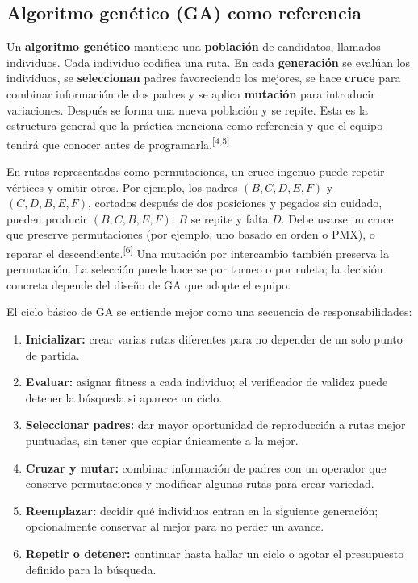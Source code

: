 \documentclass[11pt,letterpaper]{article}
\newcommand{\src}[1]{\textsuperscript{\textcolor{cian}{[#1]}}}
\begin{document}
\subsection{Algoritmo genético (GA) como referencia}
Un \textbf{algoritmo genético} mantiene una \textbf{población} de candidatos, llamados individuos. Cada individuo codifica una ruta. En cada \textbf{generación} se evalúan los individuos, se \textbf{seleccionan} padres favoreciendo los mejores, se hace \textbf{cruce} para combinar información de dos padres y se aplica \textbf{mutación} para introducir variaciones. Después se forma una nueva población y se repite. Esta es la estructura general que la práctica menciona como referencia y que el equipo tendrá que conocer antes de programarla.\src{4,5}

En rutas representadas como permutaciones, un cruce ingenuo puede repetir vértices y omitir otros. Por ejemplo, los padres $(B,C,D,E,F)$ y $(C,D,B,E,F)$, cortados después de dos posiciones y pegados sin cuidado, pueden producir $(B,C,B,E,F)$: $B$ se repite y falta $D$. Debe usarse un cruce que preserve permutaciones (por ejemplo, uno basado en orden o PMX), o reparar el descendiente.\src{6} Una mutación por intercambio también preserva la permutación. La selección puede hacerse por torneo o por ruleta; la decisión concreta depende del diseño de GA que adopte el equipo.

El ciclo básico de GA se entiende mejor como una secuencia de responsabilidades:
\begin{enumerate}[leftmargin=*]
\item \textbf{Inicializar:} crear varias rutas diferentes para no depender de un solo punto de partida.
\item \textbf{Evaluar:} asignar fitness a cada individuo; el verificador de validez puede detener la búsqueda si aparece un ciclo.
\item \textbf{Seleccionar padres:} dar mayor oportunidad de reproducción a rutas mejor puntuadas, sin tener que copiar únicamente a la mejor.
\item \textbf{Cruzar y mutar:} combinar información de padres con un operador que conserve permutaciones y modificar algunas rutas para crear variedad.
\item \textbf{Reemplazar:} decidir qué individuos entran en la siguiente generación; opcionalmente conservar al mejor para no perder un avance.
\item \textbf{Repetir o detener:} continuar hasta hallar un ciclo o agotar el presupuesto definido para la búsqueda.
\end{enumerate}
\end{document}
